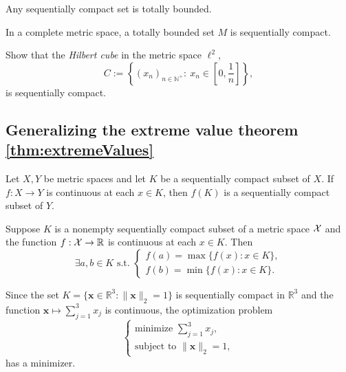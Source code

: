 \begin{lem}
  \label{lem:compactnessImpliesTotalBoundedness}
  Any sequentially compact set is totally bounded. 
\end{lem}

\begin{lem}
  \label{lem:seqCompactFromTotalBoundedness}
  In a complete metric space,
  a totally bounded set $M$ is sequentially compact.
\end{lem}

\begin{exc}
  \label{exm:HilbertCube}
  Show that the \emph{Hilbert cube}
  in the metric space $\ell^2$, %
  \begin{equation}
    \label{eq:HilbertCube}
    C := \left\{
      (x_n)_{n\in \mathbb{N}^+}:\ x_n\in \left[0,\frac{1}{n}\right]
      \right\}, 
  \end{equation}
  is sequentially compact.
\end{exc}


\subsection{Generalizing
  the extreme value theorem \ref{thm:extremeValues}}

\begin{lem}
  \label{lem:contFuncPreservesCompactness}
  Let $X,Y$ be metric spaces and
  let $K$ be a sequentially compact subset of $X$.
  If $f:X \rightarrow Y$ is continuous at each $x\in K$,
  then $f(K)$ is a sequentially compact subset of $Y$.
\end{lem}

\begin{thm}[Weierstrass]
  \label{thm:ExtremeValueThmGeneral}
  Suppose $K$ is a nonempty sequentially compact subset
  of a metric space ${\cal X}$
  and the function $f: {\cal X}\rightarrow \mathbb{R}$ is
  continuous at each $x\in K$.
  Then
  \begin{displaymath}
    \exists a,b\in K \text{ s.t. }
    \left\{
      \begin{array}{l}
        f(a) = \max\{f(x): x\in K\},
        \\
        f(b) = \min\{f(x): x\in K\}.
      \end{array}
      \right.
  \end{displaymath}
\end{thm}

\begin{exm}
  Since the set $K=\{\mathbf{x}\in \mathbb{R}^3: \|\mathbf{x}\|_2=1\}$
  is sequentially compact in $\mathbb{R}^3$ and the function
  $\mathbf{x}\mapsto \sum_{j=1}^3x_j$ is continuous,
  the optimization problem
  \begin{displaymath}
    \left\{
      \begin{array}{l}
        \text{minimize } \sum_{j=1}^3 x_j,
        \\
        \text{subject to } \|\mathbf{x}\|_2=1,
      \end{array}
    \right.
  \end{displaymath}
  has a minimizer.
\end{exm}



